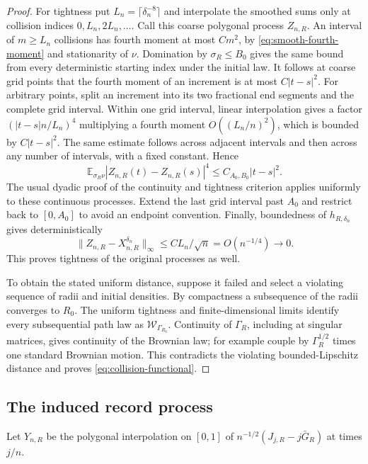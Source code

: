 \begin{proof}
For tightness put $L_n=\lceil\delta_n^{-8}\rceil$ and interpolate the
smoothed sums only at collision indices $0,L_n,2L_n,\ldots$.
Call this coarse polygonal process $Z_{n,R}$. An interval of $m\ge L_n$
collisions has fourth moment at most $Cm^2$, by
\eqref{eq:smooth-fourth-moment} and stationarity of $\nu$. Domination
by $\sigma_R\le B_0$ gives the same bound from every deterministic
starting index under the initial law. It follows at coarse grid points
that the fourth moment of an increment is at most $C|t-s|^2$.
For arbitrary points, split an increment into its two fractional end
segments and the complete grid interval. Within one grid interval,
linear interpolation gives a factor $(|t-s|n/L_n)^4$ multiplying a
fourth moment $O((L_n/n)^2)$, which is bounded by $C|t-s|^2$.
The same estimate follows across adjacent intervals and then across
any number of intervals, with a fixed constant. Hence
\[
 \mathbb E_{\sigma_R\nu}|Z_{n,R}(t)-Z_{n,R}(s)|^4
       \le C_{A_0,B_0}|t-s|^2.
\]
The usual dyadic proof of the continuity and tightness criterion applies
uniformly to these continuous processes. Extend the last grid interval
past $A_0$ and restrict back to $[0,A_0]$ to avoid an endpoint convention.
Finally, boundedness of $h_{R,\delta_n}$ gives deterministically
\[
 \|Z_{n,R}-X_{n,R}^{\delta_n}\|_\infty
       \le C L_n/\sqrt n=O(n^{-1/4})\longrightarrow0.
\]
This proves tightness of the original processes as well.

To obtain the stated uniform distance, suppose it failed and select a
violating sequence of radii and initial densities. By compactness a
subsequence of the radii converges to $R_0$. The uniform tightness and
finite-dimensional limits identify every subsequential path law as
$\mathcal W_{\Gamma_{R_0}}$. Continuity of $\Gamma_R$, including at
singular matrices, gives continuity of the Brownian law; for example
couple by $\Gamma_R^{1/2}$ times one standard Brownian motion. This
contradicts the violating bounded-Lipschitz distance and proves
\eqref{eq:collision-functional}.
\end{proof}

\subsection{The induced record process}
Let $Y_{n,R}$ be the polygonal interpolation on $[0,1]$ of
$n^{-1/2}(J_{j,R}-j\bar G_R)$ at times $j/n$.


